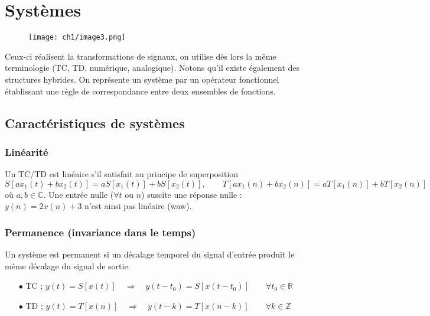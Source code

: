 \section{Systèmes}	
\begin{wrapfigure}[8]{l}{8.5cm}
\texttt{[image: ch1/image3.png]}
\end{wrapfigure}
Ceux-ci réalisent la transformations de signaux, on utilise dès lors la même terminologie 
(TC, TD, numérique, analogique). Notons qu'il existe également des structures hybrides. 
On représente un système par un opérateur fonctionnel établissant une règle de correspondance 
entre deux ensembles de fonctions.\\

	\subsection{Caractéristiques de systèmes}
		\subsubsection{Linéarité}
		Un TC/TD est linéaire s'il satisfait au principe de superposition
		\begin{equation}
		S[ax_1(t)+bx_2(t)] = aS[x_1(t)] + bS[x_2(t)],\qquad 
		T[ax_1(n)+bx_2(n)] = aT[x_1(n)] + bT[x_2(n)]
		\end{equation}
		où $a,b\in\mathbb{C}$. Une entrée nulle ($\forall t$ ou $n$) suscite une réponse 
		nulle : $y(n) = 2x(n)+3$ n'est ainsi pas linéaire (waw).
		
		\subsubsection{Permanence (invariance dans le temps)}
		Un système est permanent si un décalage temporel du signal d’entrée produit le même 
		décalage du signal de sortie.
		\begin{itemize}
		\item[$\bullet$ TC ;] $y(t) = S[x(t)]\quad\Rightarrow\quad y(t-t_0) = S[x(t-t_0)]\qquad 
		\forall t_0\in\mathbb{R}$
		\item[$\bullet$ TD ;] $y(t) = T[x(n)]\quad\Rightarrow\quad y(t-k) = T[x(n-k)]\qquad 
		\forall k\in\mathbb{Z}$		
		\end{itemize}
		
